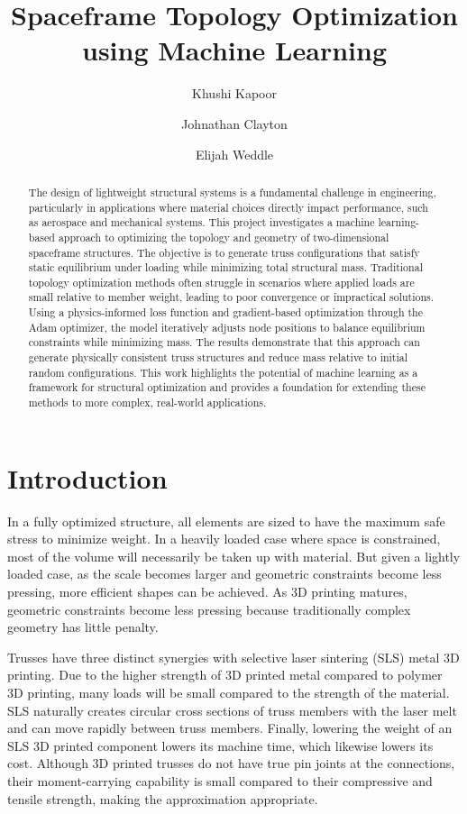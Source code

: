 \documentclass[11pt]{article}
\title{\textbf{Spaceframe Topology Optimization using Machine Learning}}
\author{Khushi Kapoor \and Johnathan Clayton \and Elijah Weddle}
\date{}
\begin{document}
\maketitle

\begin{abstract}
The design of lightweight structural systems is a fundamental challenge in engineering, particularly in applications where material choices directly impact performance, such as aerospace and mechanical systems. This project investigates a machine learning-based approach to optimizing the topology and geometry of two-dimensional spaceframe structures. The objective is to generate truss configurations that satisfy static equilibrium under loading while minimizing total structural mass. Traditional topology optimization methods often struggle in scenarios where applied loads are small relative to member weight, leading to poor convergence or impractical solutions. Using a physics-informed loss function and gradient-based optimization through the Adam optimizer, the model iteratively adjusts node positions to balance equilibrium constraints while minimizing mass. The results demonstrate that this approach can generate physically consistent truss structures and reduce mass relative to initial random configurations. This work highlights the potential of machine learning as a framework for structural optimization and provides a foundation for extending these methods to more complex, real-world applications.
\end{abstract}

\section{Introduction}

In a fully optimized structure, all elements are sized to have the maximum safe stress to minimize weight. In a heavily loaded case where space is constrained, most of the volume will necessarily be taken up with material. But given a lightly loaded case, as the scale becomes larger and geometric constraints become less pressing, more efficient shapes can be achieved. As 3D printing matures, geometric constraints become less pressing because traditionally complex geometry has little penalty.

Trusses have three distinct synergies with selective laser sintering (SLS) metal 3D printing. Due to the higher strength of 3D printed metal compared to polymer 3D printing, many loads will be small compared to the strength of the material. SLS naturally creates circular cross sections of truss members with the laser melt and can move rapidly between truss members. Finally, lowering the weight of an SLS 3D printed component lowers its machine time, which likewise lowers its cost. Although 3D printed trusses do not have true pin joints at the connections, their moment-carrying capability is small compared to their compressive and tensile strength, making the approximation appropriate.
\end{document}
